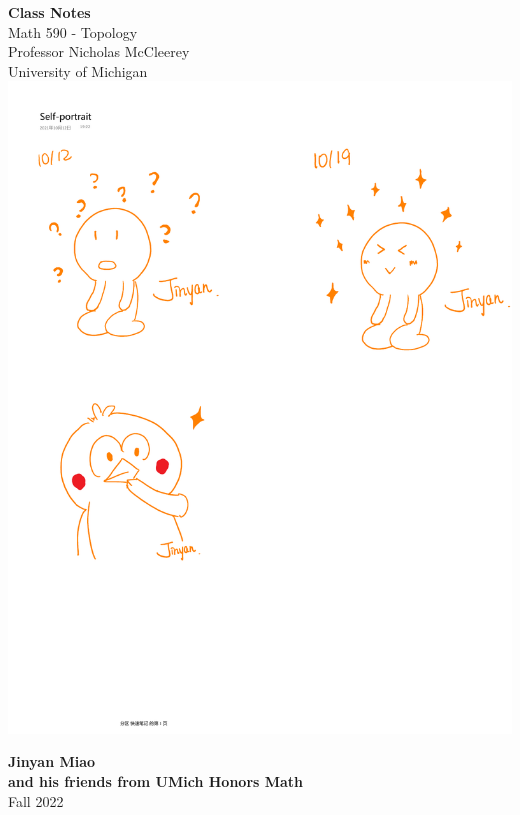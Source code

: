\documentclass[11pt]{book}
\theoremstyle{break}
\theoremstyle{break}
\begin{document}
	\begin{titlepage}
		\begin{center}
			\vspace*{1cm}
			\Huge \color{red}
				\textbf{Class Notes}\\
			\vspace{0.5cm}			
			\Large \color{black}
				Math 590 - Topology\\
				Professor Nicholas McCleerey\\	
				University of Michigan\\
			\vspace{2cm}
			\includegraphics[scale=1.15]{hmm.pdf}
			
			
			\vspace{4cm}
			\LARGE
				\textbf{Jinyan Miao}\\
				\large \textbf{and his friends from UMich Honors Math}\\
				\hfill\break
				\LARGE Fall 2022\\
			\vspace{1cm}

		\vspace*{\fill}
		\end{center}			
	\end{titlepage}
\end{document}
